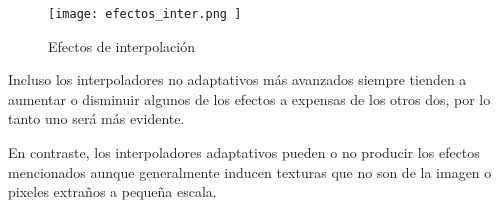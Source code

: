 \begin{figure}[H]
    \texttt{[image:  efectos\_inter.png ]}
    \centering
    \caption{ Efectos de interpolación}
    \label{fig:efectos_inter}
\end{figure}

Incluso los interpoladores no adaptativos más avanzados siempre tienden a aumentar
o disminuir algunos de los efectos a expensas de los otros dos, por lo tanto uno 
será más evidente. 

En contraste, los interpoladores adaptativos pueden o no producir los efectos 
mencionados aunque generalmente inducen texturas que no son de la imagen o 
pixeles extraños a pequeña escala.

